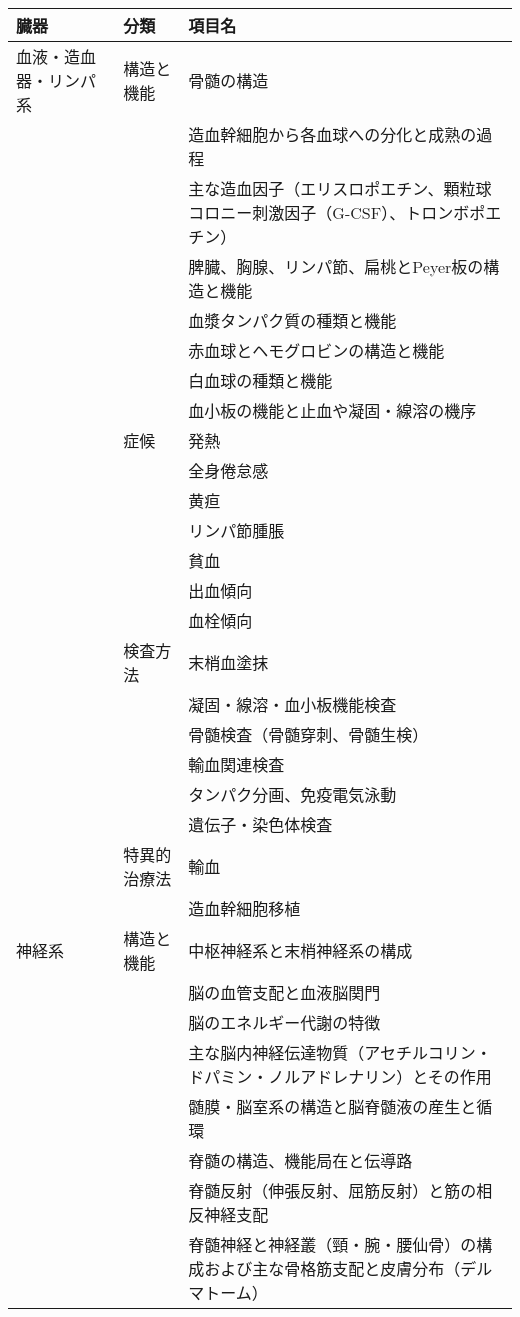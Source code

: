 \begin{xltabular}{\linewidth}{XXX}
\caption{\label{tbl:知識}} \\
\toprule
臓器 & 分類 & 項目名 \\
\midrule
\endhead
血液・造血器・リンパ系 & 構造と機能 & 骨髄の構造 \\
 &  & 造血幹細胞から各血球への分化と成熟の過程 \\
 &  & 主な造血因子（エリスロポエチン、顆粒球コロニー刺激因子（G-CSF）、トロンボポエチン） \\
 &  & 脾臓、胸腺、リンパ節、扁桃とPeyer板の構造と機能 \\
 &  & 血漿タンパク質の種類と機能 \\
 &  & 赤血球とヘモグロビンの構造と機能 \\
 &  & 白血球の種類と機能 \\
 &  & 血小板の機能と止血や凝固・線溶の機序 \\
 & 症候 & 発熱 \\
 &  & 全身倦怠感 \\
 &  & 黄疸 \\
 &  & リンパ節腫脹 \\
 &  & 貧血 \\
 &  & 出血傾向 \\
 &  & 血栓傾向 \\
 & 検査方法 & 末梢血塗抹 \\
 &  & 凝固・線溶・血小板機能検査 \\
 &  & 骨髄検査（骨髄穿刺、骨髄生検） \\
 &  & 輸血関連検査 \\
 &  & タンパク分画、免疫電気泳動 \\
 &  & 遺伝子・染色体検査 \\
 & 特異的治療法 & 輸血 \\
 &  & 造血幹細胞移植 \\
神経系 & 構造と機能 & 中枢神経系と末梢神経系の構成 \\
 &  & 脳の血管支配と血液脳関門 \\
 &  & 脳のエネルギー代謝の特徴 \\
 &  & 主な脳内神経伝達物質（アセチルコリン・ドパミン・ノルアドレナリン）とその作用 \\
 &  & 髄膜・脳室系の構造と脳脊髄液の産生と循環 \\
 &  & 脊髄の構造、機能局在と伝導路 \\
 &  & 脊髄反射（伸張反射、屈筋反射）と筋の相反神経支配 \\
 &  & 脊髄神経と神経叢（頸・腕・腰仙骨）の構成および主な骨格筋支配と皮膚分布（デルマトーム） \\

\end{xltabular}
